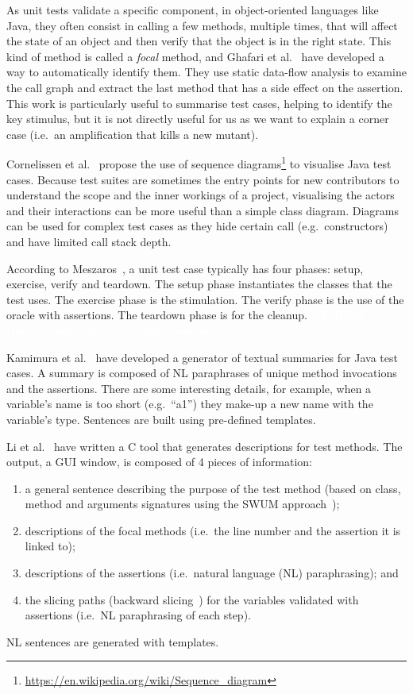 \documentclass[a4paper,11pt]{sdm_internship}
\newcommand{\CS}{C\nolinebreak\hspace{-.05em}\raisebox{.6ex}{\scriptsize\bf \#}}
\newcommand{\todo}[1]{\colorbox{Red!75}{\textcolor{white}{\textbf{TODO\ifx&#1&\else: #1\fi}}}}
\newcommand{\rephrase}[1]{\colorbox{BlueViolet!60}{\textcolor{white}{\textbf{$\sim$#1}}}}
\theoremstyle{definition}
\begin{document}
As unit tests validate a specific component, in object-oriented languages like Java, they often consist in calling a few methods, multiple times, that will affect the state of an object and then verify that the object is in the right state.
This kind of method is called a \emph{focal} method, and Ghafari et al.~\cite{ghafari2015automatically} have developed a way to automatically identify them.
They use static data-flow analysis to examine the call graph and extract the last method that has a side effect on the assertion.
This work is particularly useful to summarise test cases, helping to identify the key stimulus, but it is not directly useful for us as we want to explain a corner case (i.e.\ an amplification that kills a new mutant).\rephrase{}

Cornelissen et al.~\cite{cornelissen2007visualizing} propose the use of sequence diagrams\footnote{\url{https://en.wikipedia.org/wiki/Sequence_diagram}} to visualise Java test cases.
Because test suites are sometimes the entry points for new contributors to understand the scope and the inner workings of a project, visualising the actors and their interactions can be more useful than a simple class diagram.
Diagrams can be used for complex test cases as they hide certain call (e.g.\ constructors) and have limited call stack depth.

According to Meszaros~\cite{meszaros2007xunit}, a unit test case typically has four phases: setup, exercise, verify and teardown.
The setup phase instantiates the classes that the test uses.
The exercise phase is the stimulation.
The verify phase is the use of the oracle with assertions.
The teardown phase is for the cleanup.\rephrase{}
\todo{move that elsewhere}

Kamimura et al.~\cite{kamimura2013towards} have developed a generator of textual summaries for Java test cases.
A summary is composed of NL paraphrases of unique method invocations and the assertions.
There are some interesting details, for example, when a variable's name is too short (e.g.\ ``a1'') they make-up a new name with the variable's type.
Sentences are built using pre-defined templates.

Li et al.~\cite{li2016automatically} have written a \CS{} tool that generates descriptions for test methods.
The output, a GUI window, is composed of 4 pieces of information:
\begin{enumerate}
  \item a general sentence describing the purpose of the test method (based on class, method and arguments signatures using the SWUM approach~\cite{herbert2016swummary});
  \item descriptions of the focal methods (i.e.\ the line number and the assertion it is linked to);
  \item descriptions of the assertions (i.e.\ natural language (NL) paraphrasing); and
  \item the slicing paths (backward slicing~\cite{jhala2005path}) for the variables validated with assertions (i.e.\ NL paraphrasing of each step).
\end{enumerate}
NL sentences are generated with templates.
\end{document}
